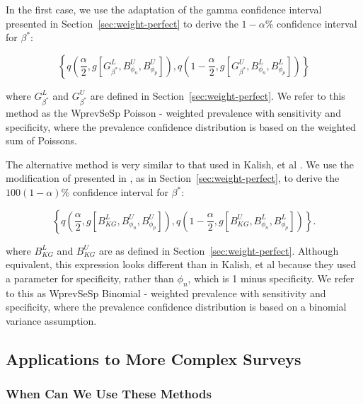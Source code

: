 \documentclass[AMA,STIX1COL]{WileyNJD-v2}
\begin{document}
In the first case, we use the adaptation of the gamma confidence interval \cite{FayF:1997} presented in Section~\ref{sec:weight-perfect} to derive the \( 1 - \alpha \)\% confidence interval for \( \beta^* \):

\begin{equation}
    \left\{ q \left( \frac{\alpha}{2}, %
    g \left[ G^L_{\beta^*}, B^U_{\phi_n}, B^U_{\phi_p} \right]
    \right),  q \left( 1 - \frac{\alpha}{2}, %
       g \left[G^U_{\beta^*}, B^L_{\phi_n}, B^L_{\phi_p} \right] \right)
       \right\}
\end{equation}

where  \( G_{\beta^*}^L \) and \( G_{\beta^*}^U \) are defined in Section~\ref{sec:weight-perfect}.
We refer to this method as the WprevSeSp Poisson - weighted prevalence with sensitivity and specificity, where the prevalence confidence distribution is based on the weighted sum of Poissons.

The alternative method is very similar to that used in Kalish, et al \cite{Kali:2021}.
We use the  modification of \cite{Korn:1998} presented in \cite{Dean:2015}, as in Section~\ref{sec:weight-perfect}, to derive the \( 100(1 - \alpha) \)\% confidence interval for \( \beta^* \):

\begin{equation}
    \left\{ q \left( \frac{\alpha}{2}, g\left[B_{KG}^L, B_{\phi_n}^U, B_{\phi_p}^U\right]  \right),  q \left( 1 - \frac{\alpha}{2}, g\left[B_{KG}^U, B_{\phi_n}^L, B_{\phi_p}^L\right]  \right) \right\}.
\end{equation}

where \( B_{KG}^L \) and \( B_{KG}^U \) are as defined in Section~\ref{sec:weight-perfect}. Although equivalent, this expression looks different than in Kalish, et al\cite{Kali:2021} because they used a parameter for specificity, rather than $\phi_n$, which is 1 minus specificity. 
We refer to this as WprevSeSp Binomial - weighted prevalence with sensitivity and specificity, where the prevalence confidence distribution is based on a binomial variance assumption.

\subsection{Applications to More Complex Surveys}
\label{sec:complex-surveys}


\subsubsection{When Can We Use These Methods}
\end{document}
